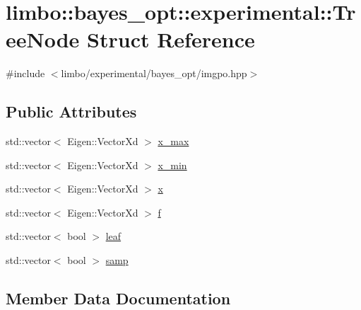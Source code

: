 \hypertarget{structlimbo_1_1bayes__opt_1_1experimental_1_1_tree_node}{}\section{limbo\+:\+:bayes\+\_\+opt\+:\+:experimental\+:\+:Tree\+Node Struct Reference}
\label{structlimbo_1_1bayes__opt_1_1experimental_1_1_tree_node}


{\ttfamily \#include $<$limbo/experimental/bayes\+\_\+opt/imgpo.\+hpp$>$}

\subsection*{Public Attributes}
\begin{DoxyCompactItemize}
\item 
std\+::vector$<$ Eigen\+::\+Vector\+Xd $>$ \hyperlink{structlimbo_1_1bayes__opt_1_1experimental_1_1_tree_node_a3948f2f233995ce1cd4b36d3944b27b9}{x\+\_\+max}
\item 
std\+::vector$<$ Eigen\+::\+Vector\+Xd $>$ \hyperlink{structlimbo_1_1bayes__opt_1_1experimental_1_1_tree_node_a09ee8e7b77c04a859ecdc253329303f4}{x\+\_\+min}
\item 
std\+::vector$<$ Eigen\+::\+Vector\+Xd $>$ \hyperlink{structlimbo_1_1bayes__opt_1_1experimental_1_1_tree_node_a790ebef4a33235acf40cf745599c4afe}{x}
\item 
std\+::vector$<$ Eigen\+::\+Vector\+Xd $>$ \hyperlink{structlimbo_1_1bayes__opt_1_1experimental_1_1_tree_node_a5c863b76ba45e3eefd34b8a284f7a892}{f}
\item 
std\+::vector$<$ bool $>$ \hyperlink{structlimbo_1_1bayes__opt_1_1experimental_1_1_tree_node_a69aca1e19bb631e4a5fee776f6965cd9}{leaf}
\item 
std\+::vector$<$ bool $>$ \hyperlink{structlimbo_1_1bayes__opt_1_1experimental_1_1_tree_node_a6f0c0d02a8129c2bd08ba8ecc1f9f0f1}{samp}
\end{DoxyCompactItemize}


\subsection{Member Data Documentation}
